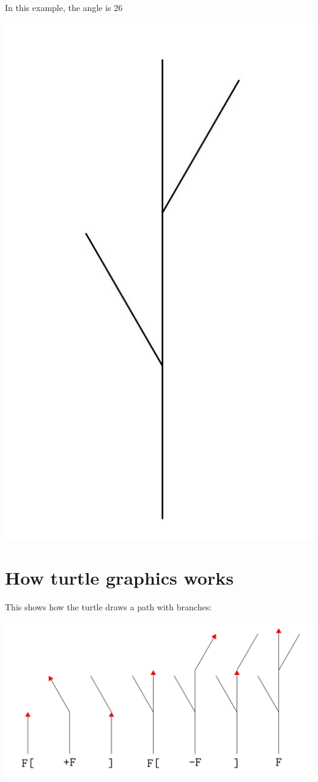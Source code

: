 \documentclass[bigger]{beamer}
\begin{document}
In this example, the angle is 26\textdegree{}
\begin{center}
\includegraphics[width=.9\linewidth]{./l_tree1.jpg}
\end{center}

\section*{How turtle graphics works}
\label{sec:org33ef1d7}

This shows how the turtle draws a path with branches:

\begin{center}
\includegraphics[width=.9\linewidth]{./growth.jpg}
\end{center}
\end{document}
